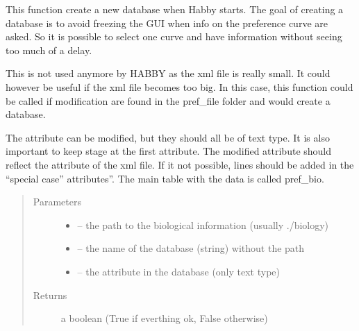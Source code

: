 \documentclass[letterpaper,10pt,english]{sphinxmanual}
\begin{document}
\begin{fulllineitems}
\label{\detokenize{index:src.bio_info.create_and_fill_database}}
This function create a new database when Habby starts. The goal of creating a database is to avoid freezing the GUI
when info on the preference curve are asked. So it is possible to select one curve and have information without
seeing too much of a delay.

This is not used anymore by HABBY as the xml file is really small.
It could however be useful if the xml file becomes too big. In this case, this function could be
called if modification are found in the pref\_file folder and would create a database.

The attribute can be modified, but they should all be of text type. It is also important to keep stage at the first
attribute. The modified attribute should reflect the attribute of the xml file. If it not possible, lines should
be added in the ``special case'' attributes''. The main table with the data is called pref\_bio.
\begin{quote}\begin{description}
\item[{Parameters}] \leavevmode\begin{itemize}
\item {} 
 -- the path to the biological information (usually ./biology)

\item {} 
 -- the name of the database (string) without the path

\item {} 
 -- the attribute in the database (only text type)

\end{itemize}

\item[{Returns}] \leavevmode
a boolean (True if everthing ok, False otherwise)

\end{description}\end{quote}

\end{fulllineitems}

\end{document}
